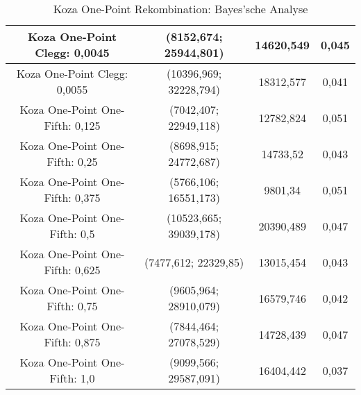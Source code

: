 \begin{table}[H]
\begin{tabular}{c | c | c | c}
		\hline
		Koza One-Point Clegg: 0,0045 & (8152,674; 25944,801) & 14620,549 & 0,045\\
		\hline
		Koza One-Point Clegg: 0,0055 & (10396,969; 32228,794) & 18312,577 & 0,041\\
		\hline
		\hline
		Koza One-Point One-Fifth: 0,125 & (7042,407; 22949,118) & 12782,824 & 0,051\\
		\hline
		Koza One-Point One-Fifth: 0,25 & (8698,915; 24772,687) & 14733,52 & 0,043\\
		\hline
		Koza One-Point One-Fifth: 0,375 & (\color{Green}5766,106\color{black}; \color{Green}16551,173\color{black}) & \color{Green}9801,34\color{black} & \color{Green}0,051\color{black} \\
		\hline
		Koza One-Point One-Fifth: 0,5 & (10523,665; 39039,178) & 20390,489 & 0,047\\
		\hline
		Koza One-Point One-Fifth: 0,625 & (7477,612; 22329,85) & 13015,454 & 0,043\\
		\hline
		Koza One-Point One-Fifth: 0,75 & (9605,964; 28910,079) & 16579,746 & 0,042\\
		\hline
		Koza One-Point One-Fifth: 0,875 & (7844,464; 27078,529) & 14728,439 & 0,047\\
		\hline
		Koza One-Point One-Fifth: 1,0 & (9099,566; 29587,091) & 16404,442 & 0,037\\
	\end{tabular}
	\caption{Koza One-Point Rekombination: Bayes'sche Analyse}
	\label{table:kozaOnePointBayesian}
\end{table} 
